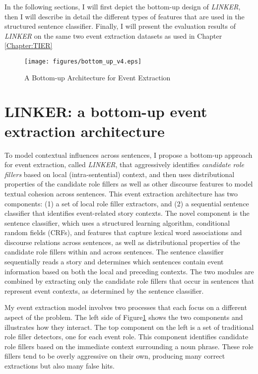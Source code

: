 In the following sections, I will first depict the 
bottom-up design of {\it LINKER}, 
then I will describe in detail the different types of features 
that are used in the structured sentence classifier. 
Finally, I will present the evaluation results of {\it LINKER} on 
the same two event extraction datasets as used in Chapter \ref{Chapter:TIER}

\begin{figure}[htbp]
 \centering
 \texttt{[image: figures/bottom\_up\_v4.eps]}
 \caption{A Bottom-up Architecture for Event Extraction}
\label{Big-Pic}
\end{figure}

\section{LINKER: a bottom-up event extraction architecture}

To model contextual influences across sentences, 
I propose a bottom-up approach for event extraction, called {\it LINKER}, that 
aggressively
identifies {\it candidate role fillers} 
based on local
(intra-sentential) context, and then uses distributional properties of
the candidate role fillers as well as other discourse features to
model textual cohesion across sentences.  This event extraction
architecture has two components: (1) a set of local role
filler extractors, and (2) a sequential sentence classifier that identifies
event-related story contexts. 
The novel component is the sentence classifier, which uses a structured learning algorithm, conditional
random fields (CRFs), and features that capture lexical word
associations and discourse relations across sentences, as well as
distributional properties of the candidate role fillers within
and across sentences. 
The sentence classifier sequentially reads a
story and determines which sentences contain event
information based on both the local and preceding contexts. 
The two modules are combined by extracting only the candidate role
fillers that occur in sentences that represent event contexts, as determined by the sentence classifier. 

My event extraction model involves two processes that each focus on a
different aspect of the problem.
The left side of Figure\ref{Big-Pic} shows the two
components and illustrates how they interact. The top component
on the left is a set of traditional role filler detectors, one for each
event role. This component identifies candidate role
fillers based on the immediate context surrounding a noun
phrase. These role fillers tend to be overly aggressive on their own, producing
many correct extractions but also many false hits.


